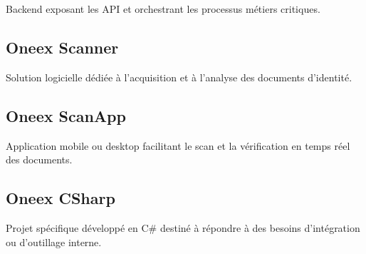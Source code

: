 Backend exposant les API et orchestrant les processus métiers critiques.

\subsection{Oneex Scanner}

Solution logicielle dédiée à l’acquisition et à l’analyse des documents d’identité.

\subsection{Oneex ScanApp}

Application mobile ou desktop facilitant le scan et la vérification en temps réel des documents.

\subsection{Oneex CSharp}

Projet spécifique développé en C\# destiné à répondre à des besoins d’intégration ou d’outillage interne.
